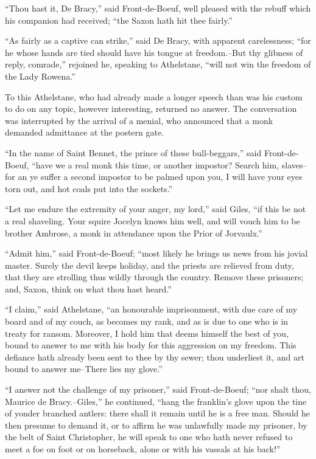``Thou hast it, De Bracy,'' said Front-de-Boeuf, well pleased with the
rebuff which his companion had received; ``the Saxon hath hit thee
fairly.''

``As fairly as a captive can strike,'' said De Bracy, with apparent
carelessness; ``for he whose hands are tied should have his tongue at
freedom.--But thy glibness of reply, comrade,'' rejoined he, speaking to
Athelstane, ``will not win the freedom of the Lady Rowena.''

To this Athelstane, who had already made a longer speech than was his
custom to do on any topic, however interesting, returned no answer. The
conversation was interrupted by the arrival of a menial, who announced
that a monk demanded admittance at the postern gate.

``In the name of Saint Bennet, the prince of these bull-beggars,'' said
Front-de-Boeuf, ``have we a real monk this time, or another impostor?
Search him, slaves--for an ye suffer a second impostor to be palmed upon
you, I will have your eyes torn out, and hot coals put into the
sockets.''

``Let me endure the extremity of your anger, my lord,'' said Giles, ``if
this be not a real shaveling. Your squire Jocelyn knows him well, and
will vouch him to be brother Ambrose, a monk in attendance upon the
Prior of Jorvaulx.''

``Admit him,'' said Front-de-Boeuf; ``most likely he brings us news from
his jovial master. Surely the devil keeps holiday, and the priests are
relieved from duty, that they are strolling thus wildly through the
country. Remove these prisoners; and, Saxon, think on what thou hast
heard.''

``I claim,'' said Athelstane, ``an honourable imprisonment, with due
care of my board and of my couch, as becomes my rank, and as is due to
one who is in treaty for ransom. Moreover, I hold him that deems himself
the best of you, bound to answer to me with his body for this aggression
on my freedom. This defiance hath already been sent to thee by thy
sewer; thou underliest it, and art bound to answer me--There lies my
glove.''

``I answer not the challenge of my prisoner,'' said Front-de-Boeuf;
``nor shalt thou, Maurice de Bracy.--Giles,'' he continued, ``hang the
franklin's glove upon the tine of yonder branched antlers: there shall
it remain until he is a free man. Should he then presume to demand it,
or to affirm he was unlawfully made my prisoner, by the belt of Saint
Christopher, he will speak to one who hath never refused to meet a foe
on foot or on horseback, alone or with his vassals at his back!''

